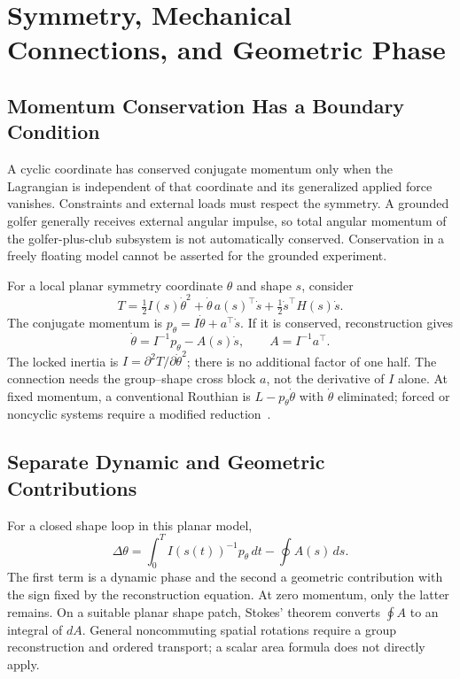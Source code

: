 \section{Symmetry, Mechanical Connections, and Geometric Phase}
\label{sec:ch9:connections}

\subsection{Momentum Conservation Has a Boundary Condition}

A cyclic coordinate has conserved conjugate momentum only when the Lagrangian is independent of that coordinate and its generalized applied force vanishes. Constraints and external loads must respect the symmetry. A grounded golfer generally receives external angular impulse, so total angular momentum of the golfer-plus-club subsystem is not automatically conserved. Conservation in a freely floating model cannot be asserted for the grounded experiment.

For a local planar symmetry coordinate $\theta$ and shape $s$, consider
\begin{equation}
 T=\tfrac12I(s)\dot\theta^2+\dot\theta\,a(s)^\top\dot s
 +\tfrac12\dot s^\top H(s)\dot s.
\end{equation}
The conjugate momentum is $p_\theta=I\dot\theta+a^\top\dot s$. If it is conserved, reconstruction gives
\begin{equation}
 \dot\theta=I^{-1}p_\theta-A(s)\dot s,\qquad A=I^{-1}a^\top.
 \label{eq:ch9:mechanical-connection}
\end{equation}
The locked inertia is $I=\partial^2T/\partial\dot\theta^2$; there is no additional factor of one half. The connection needs the group--shape cross block $a$, not the derivative of $I$ alone. At fixed momentum, a conventional Routhian is $L-p_\theta\dot\theta$ with $\dot\theta$ eliminated; forced or noncyclic systems require a modified reduction~\cite{BulloLewis2004}.

\subsection{Separate Dynamic and Geometric Contributions}

For a closed shape loop in this planar model,
\begin{equation}
 \Delta\theta=\int_0^T I(s(t))^{-1}p_\theta\,dt-\oint A(s)\,ds.
 \label{eq:ch9:berry-phase-formula}
\end{equation}
The first term is a dynamic phase and the second a geometric contribution with the sign fixed by the reconstruction equation. At zero momentum, only the latter remains. On a suitable planar shape patch, Stokes' theorem converts $\oint A$ to an integral of $dA$. General noncommuting spatial rotations require a group reconstruction and ordered transport; a scalar area formula does not directly apply.

